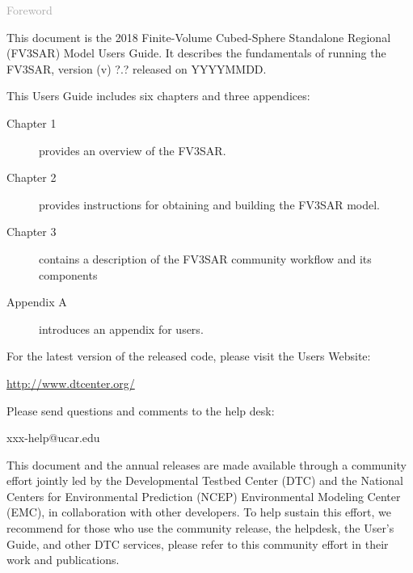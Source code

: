 \begin{titlepage}
\vspace*{0.5cm}
\noindent

\begin{flushleft}
\textcolor{darkgray}{\LARGE Foreword}
\vspace*{1cm}\par

This document is the 2018 Finite-Volume Cubed-Sphere Standalone Regional (FV3SAR) Model User\textquotesingle s Guide. It describes the fundamentals of running the FV3SAR, version (v) ?.? released on YYYYMMDD. 

This User\textquotesingle s Guide includes six chapters and three appendices:
\begin{description}
\item[Chapter 1] provides an overview of the FV3SAR.
\item[Chapter 2] provides instructions for obtaining and building the FV3SAR model.
\item[Chapter 3] contains a description of the FV3SAR community workflow and its components 
\item[Appendix A] introduces an appendix for users.
\end{description}

For the latest version of the released code, please visit the User\textquotesingle s Website:
\begin{center}
\url{http://www.dtcenter.org/}
\end{center}

Please send questions and comments to the help desk:
\begin{center}
xxx-help@ucar.edu
\end{center}

This document and the annual releases are made available through a community effort jointly led by the Developmental Testbed Center (DTC) and the National Centers for Environmental Prediction (NCEP) Environmental Modeling Center (EMC), in collaboration with other developers. To help sustain this effort, we recommend for those who use the community release, the  helpdesk, the User's Guide, and other DTC services, please refer to this community effort in their work and publications. 


\end{flushleft}
\end{titlepage}
\pagebreak{}




